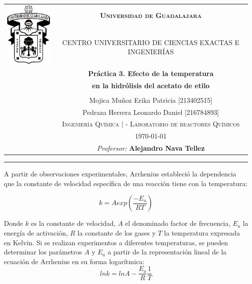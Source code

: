 \documentclass[12pt,letterpaper]{article}
\begin{document}
\renewcommand{\tablename}{Tabla}
\thispagestyle{empty}
\sloppy  

\begin{center}
    \begin{tabular}{cc}
        \multirow{2}{3.5cm}{\includegraphics[width=3cm]{Figuras/udg.pdf}}	& \huge{\textsc{\textbf{Universidad de Guadalajara}}}\\
        & \scriptsize{\textsc{CENTRO UNIVERSITARIO DE CIENCIAS EXACTAS E INGENIERÍAS}}   \\ [5mm]
        & \Large{ \textsf{\textbf{Práctica 3. Efecto de la temperatura } } }             \\
        & \Large{ \textsf{\textbf{en la hidrólisis del acetato de etilo } } }            \\
        &                                                                                \\
        & \small{\textsf{Mojica Muñoz Erika Patricia [213402515] } }                     \\
        & \small{\textsf{Pedraza Herrera Leonardo Daniel [216784893] } }                 \\ 
        & \small{\textsc{Ingeniería Química $|$  - Laboratorio de reactores Químicos} }  \\
        & \today                                                                         \\
        & \small{\textit{Profersor:}}  \textbf{\small{Alejandro Nava Tellez } }          \\
    \end{tabular}
\end{center}


\rule{\linewidth}{0.75mm}

\tableofcontents
    A partir de observaciones experimentales, Arrhenius estableció la dependencia que la
    constante de velocidad específica de una reacción tiene con la temperatura:
            
            $$ k=A exp \left( \frac{-E_{a}}{RT}\right ) $$

    Donde $k$ es la constante de velocidad, $A$ el denominado factor de frecuencia, $E_a$ la
    energía de activación, $R$ la constante de los gases y $T$ la temperatura expresada en
    Kelvin. Si se realizan experimentos a diferentes temperaturas, se pueden determinar
    los parámetros $A$ y $E_a$ a partir de la representación lineal de la ecuación de Arrhenius
    en su forma logarítmica:
            $$ ln k =ln A - \dfrac{E_a}{R} \dfrac{1}{T} $$







    
\end{document}
